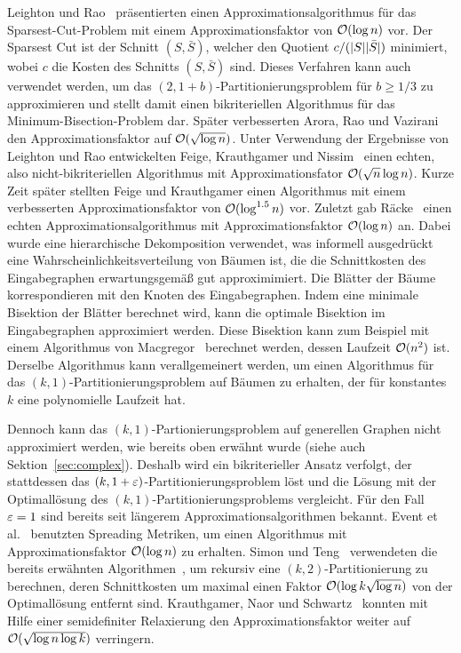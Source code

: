 Leighton und Rao~\cite{LR99} präsentierten einen Approximationsalgorithmus für das Sparsest-Cut-Problem mit einem Approximationsfaktor von $\mathcal{O}(\log n)$ vor.
Der Sparsest Cut ist der Schnitt $(S, \bar{S})$, welcher den Quotient $c/(\lvert S\rvert \lvert\bar{S}\rvert)$ minimiert, wobei $c$ die Kosten des Schnitts $(S, \bar{S})$ sind.
Dieses Verfahren kann auch verwendet werden, um das $(2, 1 + b)$\hyp Partitionierungsproblem für $b \geq 1/3$ zu approximieren und stellt damit einen bikriteriellen Algorithmus für das Minimum-Bisection-Problem dar.
Später verbesserten Arora, Rao und Vazirani~\cite{ARV09} den Approximationsfaktor auf $\mathcal{O}(\sqrt{\log n})$.
Unter Verwendung der Ergebnisse von Leighton und Rao entwickelten Feige, Krauthgamer und Nissim~\cite{FKN00} einen echten, also nicht-bikriteriellen Algorithmus mit Approximationsfator $\mathcal{O}(\sqrt{n} \log n)$.
Kurze Zeit später stellten Feige und Krauthgamer einen Algorithmus mit einem verbesserten Approximationsfaktor von $\mathcal{O}(\log^{1.5} n)$ vor.
Zuletzt gab Räcke~\cite{rc08} einen echten Approximationsalgorithmus mit Approximationsfaktor $\mathcal{O}(\log n)$ an.
Dabei wurde eine hierarchische Dekomposition verwendet, was informell ausgedrückt eine Wahrscheinlichkeitsverteilung von Bäumen ist, die die Schnittkosten des Eingabegraphen erwartungsgemäß gut approximimiert.
Die Blätter der Bäume korrespondieren mit den Knoten des Eingabegraphen.
Indem eine minimale Bisektion der Blätter berechnet wird, kann die optimale Bisektion im Eingabegraphen approximiert werden.
Diese Bisektion kann zum Beispiel mit einem Algorithmus von Macgregor~\cite{mcg78} berechnet werden, dessen Laufzeit $\mathcal{O}(n^2)$ ist.
Derselbe Algorithmus kann verallgemeinert werden, um einen Algorithmus für das $(k, 1)$\hyp Partitionierungsproblem auf Bäumen zu erhalten, der für konstantes $k$ eine polynomielle Laufzeit hat.

Dennoch kann das $(k, 1)$\hyp Partionierungsproblem auf generellen Graphen nicht approximiert werden, wie bereits oben erwähnt wurde (siehe auch Sektion~\ref{sec:complex}).
Deshalb wird ein bikriterieller Ansatz verfolgt, der stattdessen das $(k,1+\varepsilon)$\hyp Partitionierungsproblem löst und die Lösung mit der Optimallösung des $(k, 1)$\hyp Partitionierungsproblems vergleicht.
Für den Fall $\varepsilon = 1$ sind bereits seit längerem Approximationsalgorithmen bekannt.
Event et al.~\cite{ENR+97} benutzten Spreading Metriken, um einen Algorithmus mit Approximationsfaktor $\mathcal{O}(\log n)$ zu erhalten.
Simon und Teng~\cite{ST97} verwendeten die bereits erwähnten Algorithmen~\cite{LR99, ARV09}, um rekursiv eine $(k, 2)$\hyp Partitionierung zu berechnen, deren Schnittkosten um maximal einen Faktor $\mathcal{O}(\log k \sqrt{\log n})$ von der Optimallösung entfernt sind.
Krauthgamer, Naor und Schwartz~\cite{KNS09} konnten mit Hilfe einer semidefiniter Relaxierung den Approximationsfaktor weiter auf $\mathcal{O}(\sqrt{\log n \log k})$ verringern.

